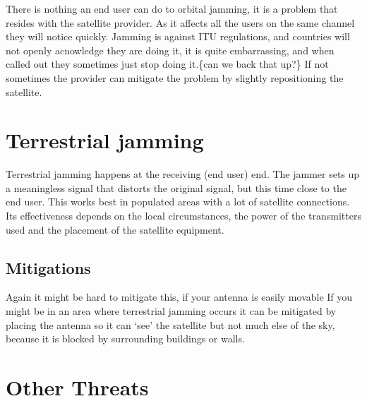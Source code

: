 There is nothing an end user can do to orbital jamming, it is a problem that resides with the satellite provider. As it affects all the users on the same channel they will notice quickly. Jamming is against ITU regulations, and countries will not openly acnowledge they are doing it, it is quite embarrassing, and when called out they sometimes just stop doing it.\{can we back that up?\} If not sometimes the provider can mitigate the problem by slightly repositioning the satellite.

\section{Terrestrial jamming}
\label{terrestrialjamming}

Terrestrial jamming happens at the receiving (end user) end. The jammer sets up a meaningless signal that distorts the original signal, but this time close to the end user. This works best in populated areas with a lot of satellite connections. Its effectiveness depends on the local circumstances, the power of the transmitters used and the placement of the satellite equipment.

\subsection{Mitigations}
\label{mitigations}

Again it might be hard to mitigate this, if your antenna is easily movable If you might be in an area where terrestrial jamming occurs it can be mitigated by placing the antenna so it can `see' the satellite but not much else of the sky, because it is blocked by surrounding buildings or walls. 

\section{Other Threats}
\label{otherthreats}

